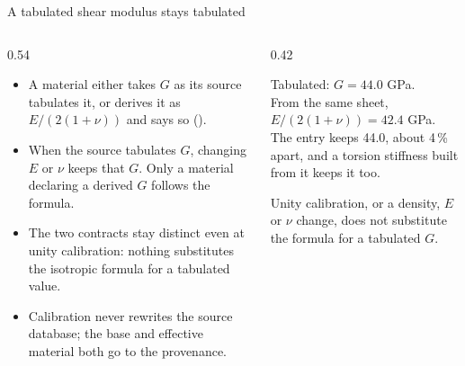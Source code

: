 \begin{frame}{A tabulated shear modulus stays tabulated}
\begin{columns}[T]
\begin{column}{0.54\textwidth}
\begin{itemize}\small
  \item A material either takes \(G\) as its source tabulates it, or derives it
        as \(E / (2(1+\nu))\) and says so ().
  \item When the source tabulates \(G\), changing \(E\) or \(\nu\) keeps that
        \(G\). Only a material declaring a derived \(G\) follows the formula.
  \item The two contracts stay distinct even at unity calibration: nothing
        substitutes the isotropic formula for a tabulated value.
  \item Calibration never rewrites the source database; the base and effective
        material both go to the provenance.
\end{itemize}
\end{column}
\begin{column}{0.42\textwidth}
\begin{ftsevidence}
\small Tabulated: \(G = 44.0\) GPa.\\
From the same sheet, \(E/(2(1+\nu)) = 42.4\) GPa.\\[1mm]
The entry keeps 44.0, about 4\,\% apart, and a torsion stiffness built from
it keeps it too.
\end{ftsevidence}
\begin{takeaway}
Unity calibration, or a density, \(E\) or \(\nu\) change, does not substitute
the formula for a tabulated \(G\).
\end{takeaway}
\end{column}
\end{columns}
\end{frame}

